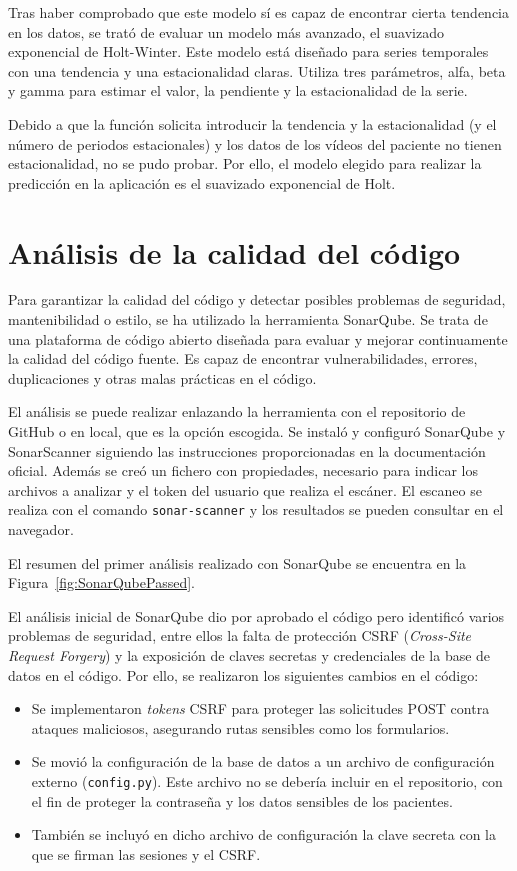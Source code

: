 Tras haber comprobado que este modelo sí es capaz de encontrar cierta tendencia en los datos, se trató de evaluar un modelo más avanzado, el suavizado exponencial de Holt-Winter. Este modelo está diseñado para series temporales con una tendencia y una estacionalidad claras. Utiliza tres parámetros, alfa, beta y gamma para estimar el valor, la pendiente y la estacionalidad de la serie.

Debido a que la función solicita introducir la tendencia y la estacionalidad (y el número de periodos estacionales) y los datos de los vídeos del paciente no tienen estacionalidad, no se pudo probar. 
Por ello, el modelo elegido para realizar la predicción en la aplicación es el suavizado exponencial de Holt.




\section{Análisis de la calidad del código}
Para garantizar la calidad del código y detectar posibles problemas de seguridad, mantenibilidad o estilo, se ha utilizado la herramienta SonarQube.
Se trata de una plataforma de código abierto diseñada para evaluar y mejorar continuamente la calidad del código fuente. Es capaz de encontrar vulnerabilidades, errores, duplicaciones y otras malas prácticas en el código.

El análisis se puede realizar enlazando la herramienta con el repositorio de GitHub o en local, que es la opción escogida. Se instaló y configuró SonarQube y SonarScanner siguiendo las instrucciones proporcionadas en la documentación oficial. Además se creó un fichero con propiedades, necesario para indicar los archivos a analizar y el token del usuario que realiza el escáner. El escaneo se realiza con el comando \texttt{sonar-scanner} y los resultados se pueden consultar en el navegador.

El resumen del primer análisis realizado con SonarQube se encuentra en la Figura~\ref{fig:SonarQubePassed}.

El análisis inicial de SonarQube dio por aprobado el código pero identificó varios problemas de seguridad, entre ellos la falta de protección CSRF (\textit{Cross-Site Request Forgery}) y la exposición de claves secretas y credenciales de la base de datos en el código.
Por ello, se realizaron los siguientes cambios en el código:
\begin{itemize}
    \item Se implementaron \textit{tokens} CSRF para proteger las solicitudes POST contra ataques maliciosos, asegurando rutas sensibles como los formularios.
    \item Se movió la configuración de la base de datos a un archivo de configuración externo (\texttt{config.py}). Este archivo no se debería incluir en el repositorio, con el fin de proteger la contraseña y los datos sensibles de los pacientes.
    \item También se incluyó en dicho archivo de configuración la clave secreta con la que se firman las sesiones y el CSRF.
\end{itemize}


